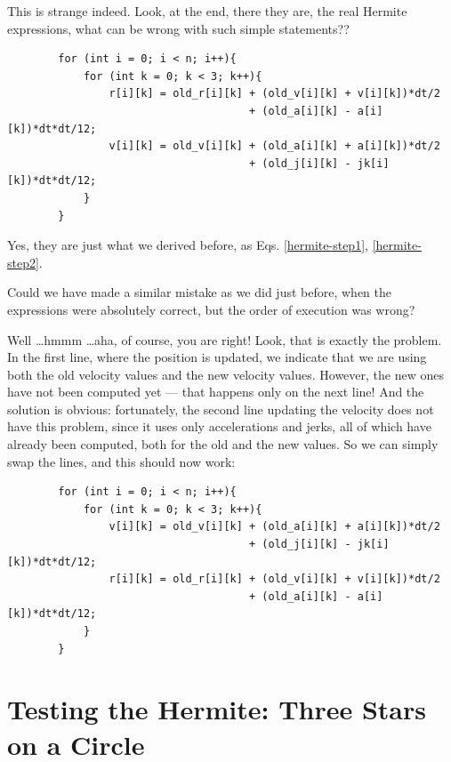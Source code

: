 \bob
This is strange indeed.  Look, at the end, there they are, the real
Hermite expressions, what can be wrong with such simple statements??

\begin{small}
\begin{verbatim}
        for (int i = 0; i < n; i++){
            for (int k = 0; k < 3; k++){
                r[i][k] = old_r[i][k] + (old_v[i][k] + v[i][k])*dt/2
                                      + (old_a[i][k] - a[i][k])*dt*dt/12;
                v[i][k] = old_v[i][k] + (old_a[i][k] + a[i][k])*dt/2
                                      + (old_j[i][k] - jk[i][k])*dt*dt/12;
            }
        }
\end{verbatim}
\end{small}

\carol
Yes, they are just what we derived before, as Eqs. \ref{hermite-step1},
\ref{hermite-step2}.

\alice
Could we have made a similar mistake as we did just before, when the
expressions were absolutely correct, but the order of execution was wrong?

\bob
Well \dots hmmm \dots aha, of course, you are right!  Look, that is
exactly the problem.  In the first line, where the position is updated,
we indicate that we are using both the old velocity values and the new
velocity values.  However, the new ones have not been computed yet ---
that happens only on the next line!  And the solution is obvious:
fortunately, the second line updating the velocity does not have this
problem, since it uses only accelerations and jerks, all of which have
already been computed, both for the old and the new values.  So we can
simply swap the lines, and this should now work:

\begin{small}
\begin{verbatim}
        for (int i = 0; i < n; i++){
            for (int k = 0; k < 3; k++){
                v[i][k] = old_v[i][k] + (old_a[i][k] + a[i][k])*dt/2
                                      + (old_j[i][k] - jk[i][k])*dt*dt/12;
                r[i][k] = old_r[i][k] + (old_v[i][k] + v[i][k])*dt/2
                                      + (old_a[i][k] - a[i][k])*dt*dt/12;
            }
        }
\end{verbatim}
\end{small}

\section{Testing the Hermite: Three Stars on a Circle}

